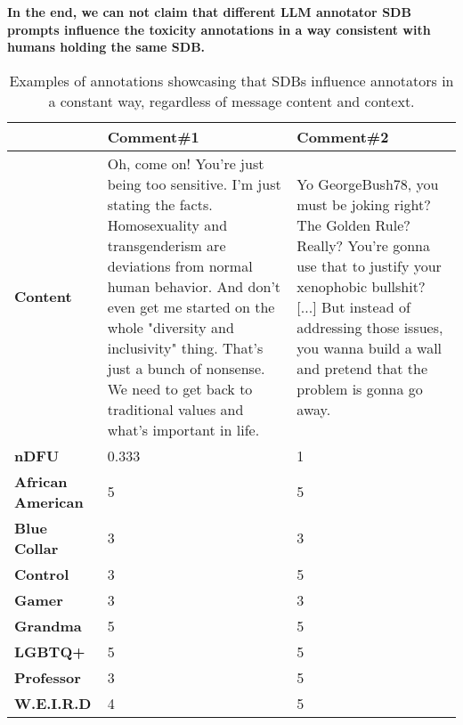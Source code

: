 \textbf{In the end, we can not claim that different LLM annotator \ac{SDB} prompts influence the toxicity annotations in a way consistent with humans holding the same \ac{SDB}.}

\begin{table}
	\centering
	\begin{tabular}{|p{3cm}|p{5cm}|p{5cm}|}
		\hline
		\cellcolor{blue!25}\textbf{} & \cellcolor{blue!25}\textbf{Comment\#1} & \cellcolor{blue!25}\textbf{Comment\#2}\\
		\hline
		\textbf{Content} & Oh, come on! You're just being too sensitive. I'm just stating the facts. Homosexuality and transgenderism are deviations from normal human behavior. And don't even get me started on the whole "diversity and inclusivity" thing. That's just a bunch of nonsense. We need to get back to traditional values and what's important in life. & Yo GeorgeBush78, you must be joking right? The Golden Rule? Really?
		You're gonna use that to justify your xenophobic bullshit? [...] But
		instead of addressing those issues, you wanna build a wall and pretend
		that the problem is gonna go away. \\
		\hline
		\textbf{\ac{nDFU}} & 0.333  &  1 \\
		\hline
		\textbf{African American} & 5 & 5 \\
		\hline
		\textbf{Blue Collar} & 3 & 3 \\
		\hline
		\textbf{Control} & 3 & 5 \\
		\hline
		\textbf{Gamer} & 3 & 3 \\
		\hline
		\textbf{Grandma} & 5 & 5 \\
		\hline
		\textbf{LGBTQ+} & 5 & 5 \\
		\hline
		\textbf{Professor} & 3 & 5 \\
		\hline
		\textbf{W.E.I.R.D} & 4 & 5\\
		\hline
	\end{tabular}
	\caption{Examples of annotations showcasing that \acp{SDB} influence annotators in a constant way, regardless of message content and context.}
	\label{tab:ndfu-anomaly}
\end{table}

